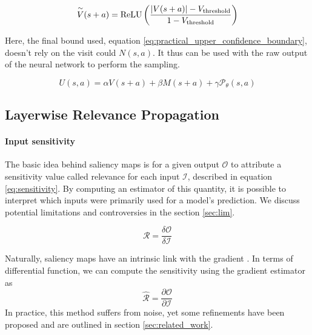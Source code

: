 \begin{equation}
\label{eq:vmlh}
    \overset{\sim}{V}(s+a)={\rm ReLU}\left(\dfrac{|V(s+a)|-V_{\rm threshold}}{1-V_{\rm threshold}}\right)
\end{equation}

Here, the final bound used, equation \ref{eq:practical_upper_confidence_boundary}, doesn't rely on the visit could $N(s,a)$. It thus can be used with the raw output of the neural network to perform the sampling.

\begin{equation}
\label{eq:practical_upper_confidence_boundary}
    U(s,a)=\alpha V(s+a)+\beta M(s+a)+\gamma \mathcal{P}_\theta(s,a)
\end{equation}


\subsection{Layerwise Relevance Propagation}

\paragraph{Input sensitivity} The basic idea behind saliency maps is for a given output $\mathcal{O}$ to attribute a sensitivity value called relevance for each input $\mathcal{I}$, described in equation \ref{eq:sensitivity}. By computing an estimator of this quantity, it is possible to interpret which inputs were primarily used for a model's prediction. We discuss potential limitations and controversies in the section \ref{sec:lim}.

\begin{equation}
\label{eq:sensitivity}
\mathcal{R}= \dfrac{\delta \mathcal{O}}{\delta \mathcal{I}}
\end{equation}

Naturally, saliency maps have an intrinsic link with the gradient \cite{Simonyan2013DeepIC}. In terms of differential function, we can compute the sensitivity using the gradient estimator as
\begin{equation}
\label{eq:grad}
\mathcal{\hat{R}}= \dfrac{\partial \mathcal{O}}{\partial \mathcal{I}}
\end{equation}
In practice, this method suffers from noise, yet some refinements have been proposed and are outlined in section \ref{sec:related_work}.

